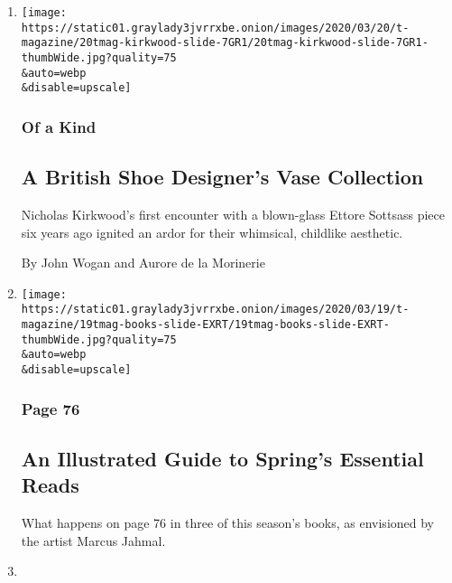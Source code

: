\begin{enumerate}
\def\labelenumi{\arabic{enumi}.}
\item
  \href{/2020/03/20/t-magazine/nicholas-kirkwood-ettore-sottsass.html}{}

  \texttt{[image: https://static01.graylady3jvrrxbe.onion/images/2020/03/20/t-magazine/20tmag-kirkwood-slide-7GR1/20tmag-kirkwood-slide-7GR1-thumbWide.jpg?quality=75\\\&auto=webp\\\&disable=upscale]}

  \hypertarget{of-a-kind}{%
  \subsubsection{Of a Kind}\label{of-a-kind}}

  \hypertarget{a-british-shoe-designers-vase-collection}{%
  \subsection{A British Shoe Designer's Vase
  Collection}\label{a-british-shoe-designers-vase-collection}}

  Nicholas Kirkwood's first encounter with a blown-glass Ettore Sottsass
  piece six years ago ignited an ardor for their whimsical, childlike
  aesthetic.

  By John Wogan and Aurore de la Morinerie
\item
  \href{/2020/03/19/t-magazine/spring-books-marcus-jahmal.html}{}

  \texttt{[image: https://static01.graylady3jvrrxbe.onion/images/2020/03/19/t-magazine/19tmag-books-slide-EXRT/19tmag-books-slide-EXRT-thumbWide.jpg?quality=75\\\&auto=webp\\\&disable=upscale]}

  \hypertarget{page-76}{%
  \subsubsection{Page 76}\label{page-76}}

  \hypertarget{an-illustrated-guide-to-springs-essential-reads}{%
  \subsection{An Illustrated Guide to Spring's Essential
  Reads}\label{an-illustrated-guide-to-springs-essential-reads}}

  What happens on page 76 in three of this season's books, as envisioned
  by the artist Marcus Jahmal.
\item
  \href{/2020/03/19/t-magazine/ts-spring-design-issue.html}{}


\end{enumerate}
